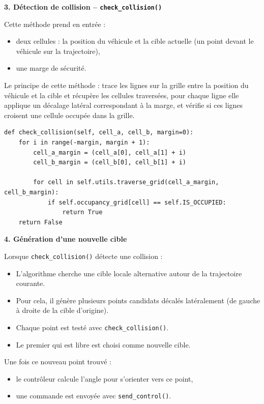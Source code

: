 \documentclass{name}
\begin{document}
\textbf{3. Détection de collision – \texttt{check\_collision()}}

Cette méthode prend en entrée :

\begin{itemize}
    \item deux cellules : la position du véhicule et la cible actuelle (un point devant le véhicule sur la trajectoire),
    \item une marge de sécurité.
\end{itemize}

Le principe de cette méthode : trace les lignes sur la grille entre la position du véhicule et la cible et récupère les cellules traversées, pour chaque ligne elle applique un décalage latéral correspondant à la marge, et vérifie si ces lignes croisent une cellule occupée dans la grille.

\begin{lstlisting}[style=pythonstyle]
def check_collision(self, cell_a, cell_b, margin=0):
    for i in range(-margin, margin + 1):
        cell_a_margin = (cell_a[0], cell_a[1] + i)
        cell_b_margin = (cell_b[0], cell_b[1] + i)

        for cell in self.utils.traverse_grid(cell_a_margin, cell_b_margin):
            if self.occupancy_grid[cell] == self.IS_OCCUPIED:
                return True
    return False
\end{lstlisting}

\textbf{4. Génération d'une nouvelle cible}

Lorsque \texttt{check\_collision()} détecte une collision :

\begin{itemize}
    \item L'algorithme cherche une cible locale alternative autour de la trajectoire courante.
    \item Pour cela, il génère plusieurs points candidats décalés latéralement (de gauche à droite de la cible d'origine).
    \item Chaque point est testé avec \texttt{check\_collision()}.
    \item Le premier qui est libre est choisi comme nouvelle cible.
\end{itemize}

Une fois ce nouveau point trouvé :

\begin{itemize}
    \item le contrôleur calcule l'angle pour s'orienter vers ce point,
    \item une commande est envoyée avec \texttt{send\_control()}.
\end{itemize}
\end{document}
